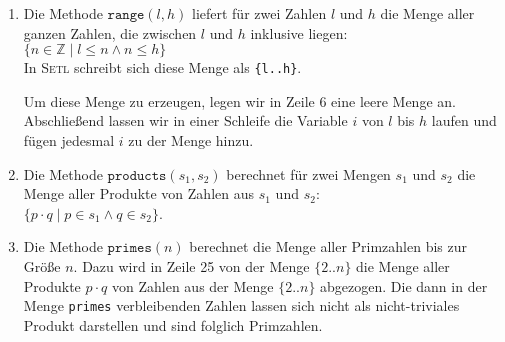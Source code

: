 \begin{enumerate}
\item Die Methode $\texttt{range}(l, h)$ liefert f\"ur zwei Zahlen $l$ und $h$
      die Menge aller ganzen Zahlen, die zwischen $l$ und $h$ inklusive liegen:
      \\[0.2cm]
      \hspace*{1.3cm}
      $\{ n \in \mathbb{Z} \mid l \leq n \wedge n \leq h \}$
      \\[0.2cm]
      In \textsc{Setl} schreibt sich diese Menge als \texttt{\{l..h\}}.  

      Um diese Menge zu erzeugen, legen wir in Zeile 6 eine leere Menge an.
      Abschlie{\ss}end lassen wir in einer Schleife die Variable $i$ von $l$ bis $h$ laufen
      und f\"ugen jedesmal $i$ zu der Menge hinzu.
\item Die Methode $\texttt{products}(s_1,s_2)$ berechnet f\"ur zwei Mengen $s_1$ und $s_2$
      die Menge aller Produkte von Zahlen aus $s_1$ und $s_2$:
      \\[0.2cm]
      \hspace*{1.3cm}
      $\{ p \cdot q \mid p \in s_1 \wedge q \in s_2 \}$.
\item Die Methode $\mathtt{primes}(n)$ berechnet die Menge aller Primzahlen bis zur Gr\"o{\ss}e
      $n$.   Dazu wird in Zeile 25 von der Menge $\{2 .. n\}$ die Menge
      aller Produkte $p \cdot q$ von Zahlen aus der Menge $\{2 .. n \}$
      abgezogen.  Die dann in der Menge \texttt{primes} verbleibenden Zahlen lassen sich
      nicht als nicht-triviales Produkt darstellen und sind folglich Primzahlen.
\end{enumerate}

